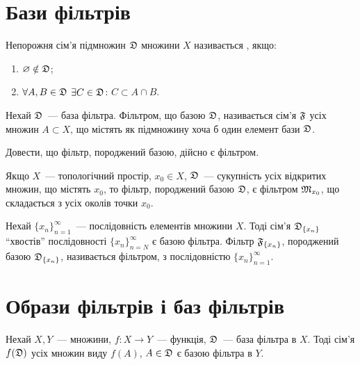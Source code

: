 \section{Бази фільтрів}

\begin{definition}
    Непорожня сім'я підмножин $\frak D$ множини $X$ називається , якщо:
    \begin{enumerate}
        \item $\emptyset \notin \frak D$;
        \item $\forall A, B \in \frak D$ $\exists C \in \frak D$: $C \subset A \cap B$.
    \end{enumerate}
\end{definition}

\begin{definition}
    Нехай $\frak D$~--- база фільтра. Фільтром, що  базою $\frak D$, називається сім'я $\frak F$ усіх множин $A \subset X$, що містять як підмножину хоча б один елемент бази $\frak D$.
\end{definition}

\begin{exercise}
    Довести, що фільтр, породжений базою, дійсно є фільтром.
\end{exercise}

\begin{example}
    Якщо $X$~--- топологічний простір, $x_0 \in X$, $\frak D$~--- сукупність усіх відкритих множин, що містять $x_0$, то фільтр, породжений базою $\frak D$, є фільтром $\frak M_{x_0}$, що складається з усіх околів точки $x_0$.
\end{example}

\begin{definition}
    Нехай $\{x_n\}_{n = 1}^\infty$~--- послідовність елементів множини $X$. Тоді сім'я $\frak D_{\{x_n\}}$ ``хвостів'' послідовності $\{x_n\}_{n = N}^\infty$ є базою фільтра. Фільтр $\frak F_{\{x_n\}}$, породжений базою $\frak D_{\{x_n\}}$, називається фільтром,  з послідовністю $\{x_n\}_{n = 1}^\infty$.
\end{definition}

\section{Образи фільтрів і баз фільтрів}

\begin{theorem}
    Нехай $X, Y$~--- множини, $f: X \to Y$~--- функція, $\frak D$~--- база фільтра в $X$. Тоді сім'я $f(\frak D)$ усіх множин виду $f(A)$, $A \in \frak D$ є базою фільтра в $Y$.
\end{theorem}


